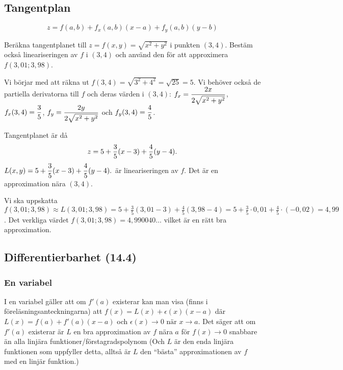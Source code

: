 \documentclass[a4paper]{article}
\begin{document}
\providecommand\fname{}
\renewcommand\fname{19-09-12}

\subsection{Tangentplan}
\[
    z = f(a,b) + f_x(a,b)(x-a)+f_y(a,b)(y-b)
\] 

\begin{ex}[Tangentplan]
    Beräkna tangentplanet till \(
        z = f(x,y) = \sqrt{x^2+y^2}
    \) i punkten \(
        (3,4)
    \). Bestäm också lineariseringen av \(
        f
    \) i \(
        (3,4)
    \) och använd den för att approximera \(
        f(3,01; 3,98)
    \).

    Vi börjar med att räkna ut \(
        f(3,4) = \sqrt{3^2+4^2} = \sqrt{25} = 5
    \). Vi behöver också de partiella derivatorna till \(
        f
    \) och deras värden i \(
        (3,4)
    \): \(
        f_x = \displaystyle\frac{2x}{2\sqrt{x^2+y^2}} 
    \), \(
        f_x(3,4) = \displaystyle\frac{3}{5} 
    \), \(
        f_y = \displaystyle\frac{2y}{2\sqrt{x^2+y^2}} 
    \) och \(
        f_y(3,4) = \displaystyle\frac{4}{5} 
    \). 

    Tangentplanet är då \[
        z = 5 + \displaystyle\frac{3}{5} (x-3) + \displaystyle\frac{4}{5} (y-4).
    \] 
    \(
        L(x,y) = 5 + \displaystyle\frac{3}{5} (x-3) + \displaystyle\frac{4}{5} (y-4).
    \) är lineariseringen av \(
        f
    \). Det är en approximation nära \(
        (3,4)
    \). 

    Vi ska uppskatta \(
        f(3,01; 3,98) \approx L(3,01; 3,98) = 5 + \frac{3}{5} (3,01-3) + \frac{4}{5} (3,98-4) 
        = 5 + \frac{3}{5} \cdot 0,01 + \frac{4}{5} \cdot (-0,02) = 4,99
    \). Det verkliga värdet \(
        f(3,01; 3,98) = 4,990040\dots
    \) vilket är en rätt bra approximation.
\end{ex}

\subsection{Differentierbarhet (14.4)}
\subsubsection{En variabel}
I en variabel gäller att om \(
    f'(a)
\) existerar kan man visa (finns i föreläsningsanteckningarna) att \(
    f(x) = L(x) + \epsilon(x)(x-a)
\) där \(
    L(x) = f(a) + f'(a)(x-a)
\) och \(
    \epsilon(x) \to 0 \text{ när } x \to a
\). Det säger att om \(
    f'(a)
\) existerar är \(
    L
\) en bra approximation av \(
    f
\) nära \(
    a
\) för \(
    f(x) \to 0 
\) snabbare än alla linjära funktioner/förstagradspolynom (Och \(
    L
\) är den enda linjära funktionen som uppfyller detta, alltså är \(
    L
\) den \enquote{bästa} approximationen av \(
    f
\) med en linjär funktion.)
\end{document}
